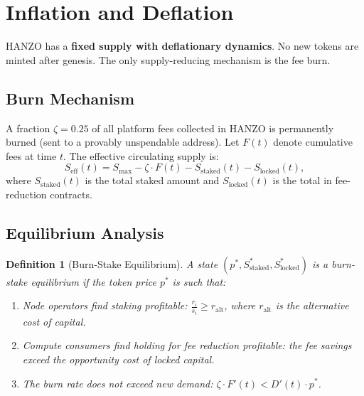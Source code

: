 \documentclass[11pt]{article}
\newtheorem{definition}{Definition}
\begin{document}
\section{Inflation and Deflation}
\label{sec:deflation}

HANZO has a \textbf{fixed supply with deflationary dynamics}. No new tokens are
minted after genesis. The only supply-reducing mechanism is the fee burn.

\subsection{Burn Mechanism}

A fraction $\zeta = 0.25$ of all platform fees collected in HANZO is
permanently burned (sent to a provably unspendable address). Let $F(t)$ denote
cumulative fees at time $t$. The effective circulating supply is:
\begin{equation}
S_{\text{eff}}(t) = S_{\max} - \zeta \cdot F(t) - S_{\text{staked}}(t) -
S_{\text{locked}}(t),
\end{equation}
where $S_{\text{staked}}(t)$ is the total staked amount and $S_{\text{locked}}(t)$
is the total in fee-reduction contracts.

\subsection{Equilibrium Analysis}

\begin{definition}[Burn-Stake Equilibrium]
A state $(p^*, S_{\text{staked}}^*, S_{\text{locked}}^*)$ is a burn-stake
equilibrium if the token price $p^*$ is such that:
\begin{enumerate}[leftmargin=1.4em]
    \item Node operators find staking profitable:
    $\frac{r_i}{s_i} \geq r_{\text{alt}}$, where $r_{\text{alt}}$ is the
    alternative cost of capital.
    \item Compute consumers find holding for fee reduction profitable:
    the fee savings exceed the opportunity cost of locked capital.
    \item The burn rate does not exceed new demand: $\zeta \cdot F'(t) <
    D'(t) \cdot p^*$.
\end{enumerate}
\end{definition}
\end{document}
